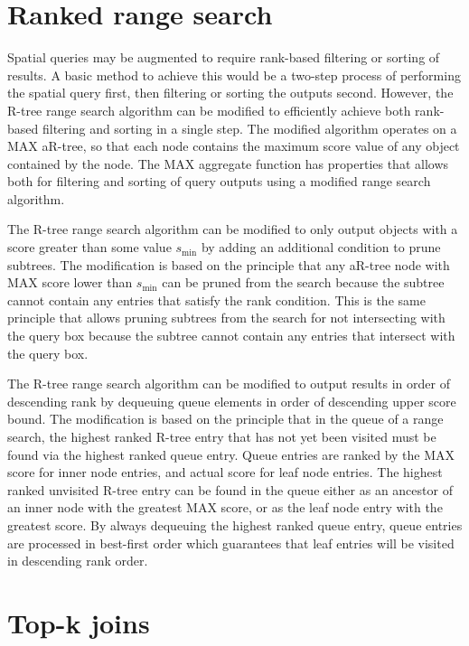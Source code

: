 \section{Ranked range search}

Spatial queries may be augmented to require rank-based filtering or sorting of results. A basic method to achieve this would be a two-step process of performing the spatial query first, then filtering or sorting the outputs second. However, the R-tree range search algorithm can be modified to efficiently achieve both rank-based filtering and sorting in a single step. The modified algorithm operates on a MAX aR-tree, so that each node contains the maximum score value of any object contained by the node. The MAX aggregate function has properties that allows both for filtering and sorting of query outputs using a modified range search algorithm.

The R-tree range search algorithm can be modified to only output objects with a score greater than some value \(s_{\min}\) by adding an additional condition to prune subtrees. The modification is based on the principle that any aR-tree node with MAX score lower than \(s_{\min}\) can be pruned from the search because the subtree cannot contain any entries that satisfy the rank condition. This is the same principle that allows pruning subtrees from the search for not intersecting with the query box because the subtree cannot contain any entries that intersect with the query box.

The R-tree range search algorithm can be modified to output results in order of descending rank by dequeuing queue elements in order of descending upper score bound. The modification is based on the principle that in the queue of a range search, the highest ranked R-tree entry that has not yet been visited must be found via the highest ranked queue entry. Queue entries are ranked by the MAX score for inner node entries, and actual score for leaf node entries. The highest ranked unvisited R-tree entry can be found in the queue either as an ancestor of an inner node with the greatest MAX score, or as the leaf node entry with the greatest score. By always dequeuing the highest ranked queue entry, queue entries are processed in best-first order which guarantees that leaf entries will be visited in descending rank order.

\section{Top-k joins}

